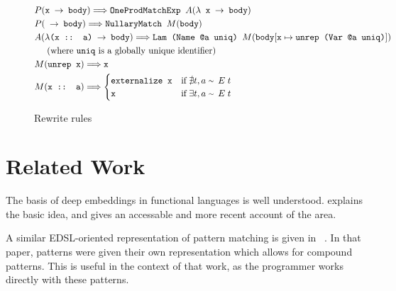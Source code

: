 \documentclass[runningheads, a4paper]{llncs}
\newcommand{\expr}[1]{(#1)} %
\newcommand{\rarr}{\rightarrow}
\newcommand{\rewrites}{\Longrightarrow}
\newcommand{\typeeq}{\raise.17ex\hbox{$\scriptstyle\mathtt{\sim}$}\,\;}
\newcommand{\ttt}{\texttt}
\newenvironment{todo}
  {\ifthenelse{\isundefined{\showtodos}}{\comment}{\begin{tcolorbox}
    \textbf{TODO}:}}
  {\ifthenelse{\isundefined{\showtodos}}{\endcomment}{\end{tcolorbox}}
  }
\begin{document}
\begin{figure}
{\begin{minipage}{\linewidth}
\begin{align*}
  &P\expr{\ttt{x $\rarr$ body}} \rewrites \ttt{OneProdMatchExp }A\expr{\ttt{$\lambda$ x $\rarr$ body}}\\
  &P\expr{\ttt{ $\rarr$ body}} \rewrites \ttt{NullaryMatch $M\expr{\ttt{body}}$}\\
  &A\expr{\ttt{$\lambda$(x :: a) $\rarr$ body}} \rewrites \ttt{Lam (Name @a uniq) $M\expr{\ttt{body$[\ttt{x} \mapsto \ttt{unrep (Var @a uniq)}]$}}$}\\
  &\text{\;\;\;\;\;(where \ttt{uniq} is a globally unique identifier)}\\
  &M\expr{\ttt{unrep x}} \rewrites \ttt{x}\\
  &M\expr{\ttt{x :: a}} \rewrites
    \begin{cases}
      \ttt{externalize x} & \text{if}\; \nexists t, a\; \typeeq E\; t\\
      \ttt{x} & \text{if}\; \exists t, a\; \typeeq E\; t
    \end{cases}
\end{align*}
  \end{minipage}
}%

\caption{Rewrite rules}
\label{fig:Rewrites}


\end{figure}



\section{Related Work}


The basis of deep embeddings in functional languages is well understood.
\cite{Elliott:03:CompileDSEL-JFP} explains the basic idea, and \cite{Gill:2014:DSLSynth}
gives an accessable and more recent account of the area.

A similar EDSL-oriented representation of pattern matching is given in
~\cite[Section~3.3]{Atkey:09:Unembedding}. In that paper, patterns were given their own
representation which allows for compound patterns. This is useful in the context
of that work, as the programmer works directly with these patterns.
\end{document}
